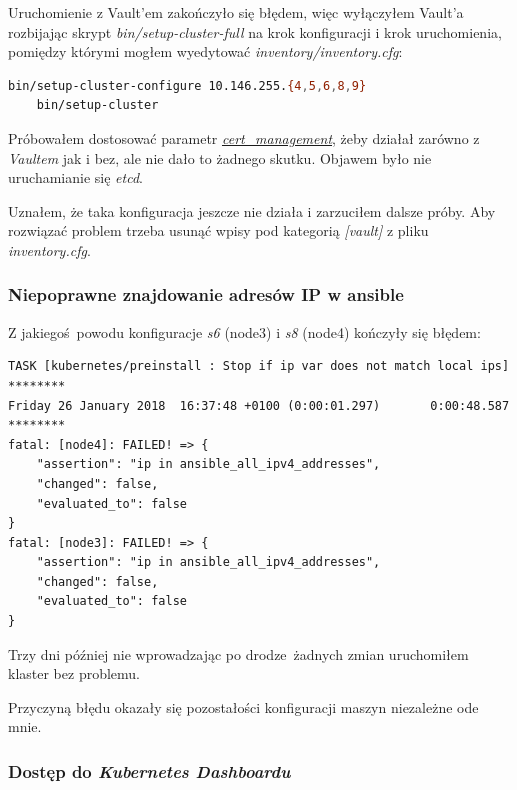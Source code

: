 \documentclass[a4paper,12pt,twoside,openany]{report}
\begin{document}
Uruchomienie z Vault'em zakończyło się błędem, więc wyłączyłem Vault'a
rozbijając skrypt \emph{bin/setup-cluster-full} na krok konfiguracji i
krok uruchomienia, pomiędzy którymi mogłem wyedytować
\emph{inventory/inventory.cfg}:

\begin{lstlisting}[language=bash]
    bin/setup-cluster-configure 10.146.255.{4,5,6,8,9}
    bin/setup-cluster
\end{lstlisting}

Próbowałem dostosować parametr
\href{https://github.com/kubernetes-incubator/kubespray/blob/master/docs/vault.md}{\emph{cert\_management}},
żeby działał zarówno z \emph{Vaultem} jak i bez, ale nie dało to żadnego
skutku. Objawem było nie uruchamianie się \emph{etcd}.

Uznałem, że taka konfiguracja jeszcze nie działa i zarzuciłem dalsze
próby. Aby rozwiązać problem trzeba usunąć wpisy pod kategorią
\emph{{[}vault{]}} z pliku \emph{inventory.cfg}.

\hypertarget{niepoprawne-znajdowanie-adresuxf3w-ip-w-ansible}{%
\subsubsection{Niepoprawne znajdowanie adresów IP w
ansible}\label{niepoprawne-znajdowanie-adresuxf3w-ip-w-ansible}}

Z jakiegoś~powodu konfiguracje \emph{s6} (node3) i \emph{s8} (node4)
kończyły się błędem:

\begin{lstlisting}
TASK [kubernetes/preinstall : Stop if ip var does not match local ips] ********
Friday 26 January 2018  16:37:48 +0100 (0:00:01.297)       0:00:48.587 ********
fatal: [node4]: FAILED! => {
    "assertion": "ip in ansible_all_ipv4_addresses",
    "changed": false,
    "evaluated_to": false
}
fatal: [node3]: FAILED! => {
    "assertion": "ip in ansible_all_ipv4_addresses",
    "changed": false,
    "evaluated_to": false
}
\end{lstlisting}

Trzy dni później nie wprowadzając po drodze~żadnych zmian uruchomiłem
klaster bez problemu.

Przyczyną błędu okazały się pozostałości konfiguracji maszyn niezależne
ode mnie.

\hypertarget{dostux119p-do-kubernetes-dashboardu}{%
\subsubsection{\texorpdfstring{Dostęp do \emph{Kubernetes
Dashboardu}}{Dostęp do Kubernetes Dashboardu}}\label{dostux119p-do-kubernetes-dashboardu}}
\end{document}
